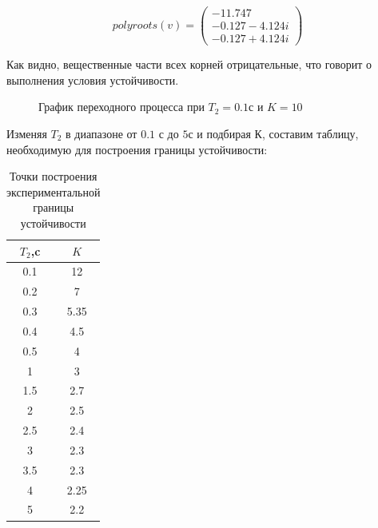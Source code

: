 \documentclass[a4paper, 11pt]{article}
\begin{document}
\begin{equation}
polyroots(v)=\left(
\begin{matrix}
-11.747 \\
-0.127-4.124i \\
-0.127+4.124i 
\end{matrix}
\right)
\end{equation}

\par 
Как видно, вещественные части всех корней отрицательные, что говорит о выполнения условия устойчивости. 

\begin{figure}[h!]
\caption{График переходного процесса при $T_2=0.1 с$ и $K=10$}
\label{ris:image}
\end{figure}

\par 
Изменяя $T_2$ в диапазоне от $0.1$ с до $5 с$ и подбирая $К$, составим таблицу, необходимую  для построения границы устойчивости:

\newpage
\begin{table}
\caption{Точки построения экспериментальной границы устойчивости}
\begin{tabular}{|c|c|}
\hline
$T_2$,c & $K$ \\
\hline
0.1 & 12 \\
\hline
0.2 & 7 \\
\hline
0.3 & 5.35 \\
\hline
0.4 & 4.5 \\
\hline
0.5 & 4 \\
\hline
1 & 3 \\
\hline
1.5 & 2.7 \\
\hline
2 & 2.5 \\
\hline
2.5 & 2.4 \\
\hline
3 & 2.3 \\
\hline
3.5 & 2.3 \\
\hline
4 & 2.25 \\
\hline
5 & 2.2 \\
\hline
\end{tabular}
\end{table}
\end{document}
